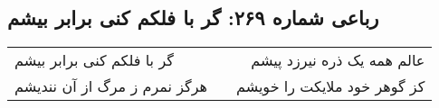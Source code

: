 \begin{center}
\section*{رباعی شماره ۲۶۹: گر با فلکم کنی برابر بیشم}
\label{sec:sh269}
\begin{longtable}{l p{0.5cm} r}
گر با فلکم کنی برابر بیشم
&&
عالم همه یک ذره نیرزد پیشم
\\
هرگز نمرم ز مرگ از آن نندیشم
&&
کز گوهر خود ملایکت را خویشم
\\
\end{longtable}
\end{center}
